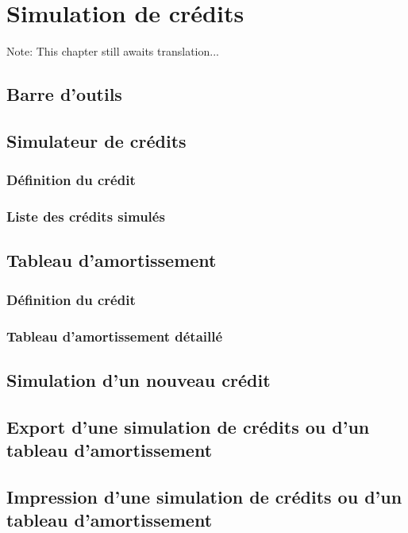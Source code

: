 

\chapter{Simulation de crédits\label{credit}}

Note: This chapter still awaits translation...


\section{Barre d'outils\label{credit-functions}}


\section{Simulateur de crédits\label{credit-simulation}}


\subsection{Définition du crédit\label{credit-simulation-definition}}

\subsection{Liste des crédits simulés\label{credit-simulation-list}}


\section{Tableau d'amortissement\label{credit-amortization}}


\subsection{Définition du crédit\label{credit-amortization-definition}}

\subsection{Tableau d'amortissement détaillé\label{credit-amortization-details}}


\section{Simulation d'un nouveau crédit\label{credit-new}}


\section{Export d'une simulation de crédits ou d'un tableau d'amortissement\label{credit-export}}

\section{Impression d'une simulation de crédits ou d'un tableau d'amortissement\label{credit-print}}


